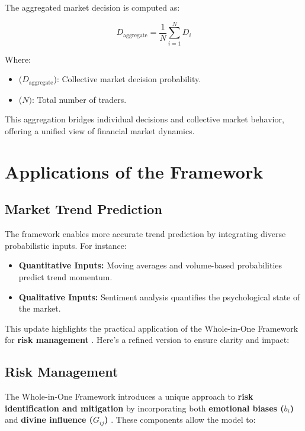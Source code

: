 \documentclass[a4]{article}
\begin{document}
The aggregated market decision is computed as:

$$
D_{\text{aggregate}} = \frac{1}{N} \sum_{i=1}^{N} D_i
$$

Where:

\begin{itemize}
\item ($D_{\text{aggregate}}$): Collective market decision probability.
\item ($N)$: Total number of traders.
\end{itemize}

This aggregation bridges individual decisions and collective market behavior, offering a unified view of financial market dynamics.



\section{Applications of the Framework}

\subsection{Market Trend Prediction} 
The framework enables more accurate trend prediction by integrating diverse probabilistic inputs. For instance:

\begin{itemize}
\item  {\bf Quantitative Inputs:}  Moving averages and volume-based probabilities predict trend momentum.
\item {\bf Qualitative Inputs:}  Sentiment analysis quantifies the psychological state of the market.
\end{itemize}

This update highlights the practical application of the Whole-in-One Framework for {\bf risk management} . Here's a refined version to ensure clarity and impact:



\subsection{Risk Management} 

The Whole-in-One Framework introduces a unique approach to {\bf risk identification and mitigation}  by incorporating both {\bf emotional biases ($b_i$)}  and {\bf divine influence ($G_{ij}$)} . These components allow the model to:

\pagebreak
\end{document}
